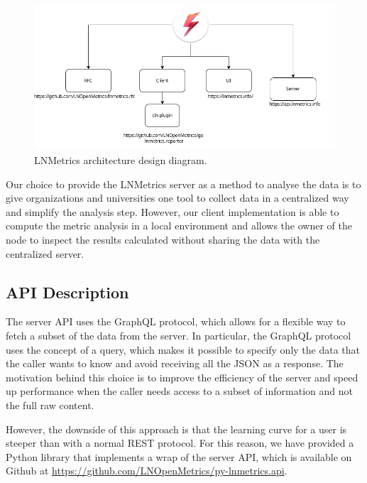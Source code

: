 \begin{figure}
    \begin{center}
    \includegraphics[scale=0.5]{imgs/lnmetrics-architecture.drawio.png}
    \end{center}
   \caption{LNMetrics architecture design diagram.}
    \label{fig:lnmetrics_architecture}
\end{figure}

Our choice to provide the LNMetrics server as a method to analyse the data 
is to give organizations and universities one tool to collect data in 
a centralized way and simplify the analysis step. However, our client
implementation is able to compute the metric analysis in a local environment 
and allows the owner of the node to inspect the results calculated without 
sharing the data with the centralized server.

\subsection{API Description}

The server API uses the GraphQL protocol, which allows for a flexible way 
to fetch a subset of the data from the server. In particular, the GraphQL 
protocol uses the concept of a query, which makes it possible to specify 
only the data that the caller wants to know and avoid receiving all the JSON 
as a response. The motivation behind this choice is to improve the efficiency 
of the server and speed up performance when the caller needs access to a subset
of information and not the full raw content.

However, the downside of this approach is that the learning curve for a user 
is steeper than with a normal REST protocol. For this reason, we have provided
a Python library that implements a wrap of the server API, which is available
on Github at \url{https://github.com/LNOpenMetrics/py-lnmetrics.api}.

